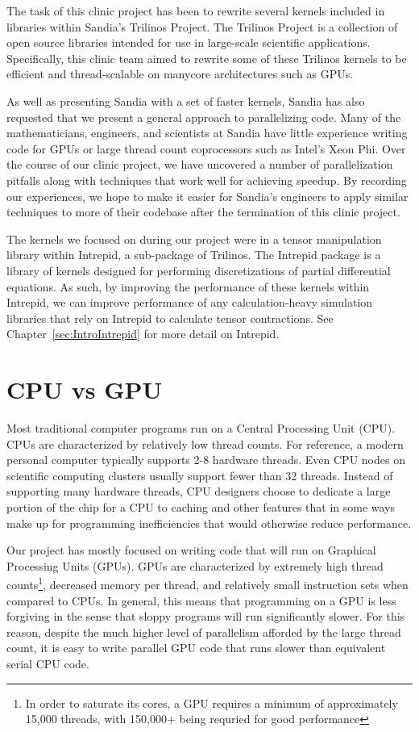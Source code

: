 The task of this clinic project has been to rewrite several kernels included in
libraries within Sandia's Trilinos Project. The Trilinos Project is a
collection of open source libraries intended for use in large-scale scientific
applications. Specifically, this clinic team aimed to rewrite some of these Trilinos kernels to be
efficient and thread-scalable on manycore architectures such as GPUs.

As well as presenting Sandia with a set of faster kernels, Sandia has also
requested that we present a general approach to parallelizing code. Many of the
mathematicians, engineers, and scientists at Sandia have little experience
writing code for GPUs or large thread count coprocessors such as Intel's Xeon Phi. Over
the course of our clinic project, we have uncovered a number of parallelization pitfalls 
along with techniques that work well for achieving speedup. By recording our experiences, we hope to
make it easier for Sandia's engineers to apply similar techniques to more of
their codebase after the termination of this clinic project.

The kernels we focused on during our project were in a tensor manipulation
library within Intrepid, a sub-package of Trilinos. The Intrepid package is a
library of kernels designed for performing discretizations of partial
differential equations. As such, by improving the performance of these kernels
within Intrepid, we can improve performance of any calculation-heavy simulation
libraries that rely on Intrepid to calculate tensor contractions. See
Chapter~\ref{sec:IntroIntrepid} for more detail on Intrepid.

\section{CPU vs GPU} \label{CPU-GPU}

Most traditional computer programs run on a Central Processing Unit (CPU). CPUs
are characterized by relatively low thread counts. For reference, a modern personal computer
typically supports 2-8 hardware threads. Even CPU nodes on scientific computing clusters usually
support fewer than 32 threads. Instead of supporting many hardware threads, CPU designers 
choose to dedicate a large portion of the chip for a CPU to
caching and other features that in some ways make up for
programming inefficiencies that would otherwise reduce performance.

Our project has mostly focused on writing code that will run on Graphical
Processing Units (GPUs). GPUs are characterized by extremely high thread counts\footnote{
In order to saturate its cores, a GPU requires a minimum of approximately 15,000 threads, 
with 150,000+ being requried for good performance},
decreased memory per thread, and relatively small instruction sets when compared
to CPUs. In general, this means that programming on a GPU is less forgiving in the 
sense that sloppy programs will run significantly slower. For this reason,
despite the much higher level of parallelism afforded by the large thread
count, it is easy to write parallel GPU code that runs slower than
equivalent serial CPU code.

